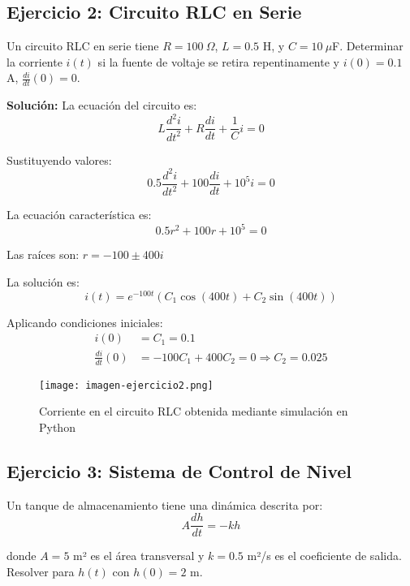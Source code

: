 \subsection{Ejercicio 2: Circuito RLC en Serie}

Un circuito RLC en serie tiene $R = 100\ \Omega$, $L = 0.5$ H, y $C = 10\ \mu$F. Determinar la corriente $i(t)$ si la fuente de voltaje se retira repentinamente y $i(0) = 0.1$ A, $\frac{di}{dt}(0) = 0$.

\textbf{Solución:}
La ecuación del circuito es:
\begin{equation}
    L \frac{d^2 i}{dt^2} + R \frac{di}{dt} + \frac{1}{C} i = 0
\end{equation}

Sustituyendo valores:
\begin{equation}
    0.5 \frac{d^2 i}{dt^2} + 100 \frac{di}{dt} + 10^5 i = 0
\end{equation}

La ecuación característica es:
\begin{equation}
    0.5r^2 + 100r + 10^5 = 0
\end{equation}

Las raíces son: $r = -100 \pm 400i$

La solución es:
\begin{equation}
    i(t) = e^{-100t} (C_1 \cos(400t) + C_2 \sin(400t))
\end{equation}

Aplicando condiciones iniciales:
\begin{align}
    i(0) &= C_1 = 0.1 \\
    \frac{di}{dt}(0) &= -100C_1 + 400C_2 = 0 \Rightarrow C_2 = 0.025
\end{align}
\begin{figure}[H]
    \centering
    \texttt{[image: imagen-ejercicio2.png]}
    \caption{Corriente en el circuito RLC obtenida mediante simulación en Python}
\end{figure}

\subsection{Ejercicio 3: Sistema de Control de Nivel}

Un tanque de almacenamiento tiene una dinámica descrita por:
\begin{equation}
    A \frac{dh}{dt} = -k h
\end{equation}

donde $A = 5$ m² es el área transversal y $k = 0.5$ m²/s es el coeficiente de salida. Resolver para $h(t)$ con $h(0) = 2$ m.

